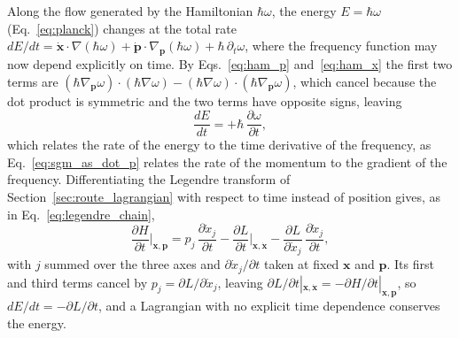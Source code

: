 \documentclass[aps,prd,onecolumn,tightenlines,nofootinbib,notitlepage,11pt,floatfix]{revtex4-2}
\theoremstyle{indentedtheorem}
\begin{document}
Along the flow generated by the Hamiltonian $\hbar\omega$, the energy $E=\hbar\omega$ (Eq.~\eqref{eq:planck}) changes at the total rate $dE/dt=\dot{\mathbf{x}}\cdot\nabla(\hbar\omega)+\dot{\mathbf{p}}\cdot\nabla_{\mathbf{p}}(\hbar\omega)+\hbar\,\partial_t\omega$, where the frequency function may now depend explicitly on time. By Eqs.~\eqref{eq:ham_p} and~\eqref{eq:ham_x} the first two terms are $(\hbar\nabla_{\mathbf{p}}\omega)\cdot(\hbar\nabla\omega)-(\hbar\nabla\omega)\cdot(\hbar\nabla_{\mathbf{p}}\omega)$, which cancel because the dot product is symmetric and the two terms have opposite signs, leaving
\begin{equation}
    \frac{dE}{dt} = +\hbar\,\frac{\partial\omega}{\partial t} ,
    \label{eq:sgm_temporal}
\end{equation}
which relates the rate of the energy to the time derivative of the frequency, as Eq.~\eqref{eq:sgm_as_dot_p} relates the rate of the momentum to the gradient of the frequency. Differentiating the Legendre transform of Section~\ref{sec:route_lagrangian} with respect to time instead of position gives, as in Eq.~\eqref{eq:legendre_chain},
\begin{equation}
    \frac{\partial H}{\partial t}\bigg|_{\mathbf{x},\mathbf{p}} = p_j\,\frac{\partial\dot{x}_j}{\partial t} - \frac{\partial L}{\partial t}\bigg|_{\mathbf{x},\dot{\mathbf{x}}} - \frac{\partial L}{\partial\dot{x}_j}\,\frac{\partial\dot{x}_j}{\partial t} ,
    \label{eq:legendre_time}
\end{equation}
with $j$ summed over the three axes and $\partial\dot{x}_j/\partial t$ taken at fixed $\mathbf{x}$ and $\mathbf{p}$. Its first and third terms cancel by $p_j=\partial L/\partial\dot{x}_j$, leaving $\partial L/\partial t|_{\mathbf{x},\dot{\mathbf{x}}}=-\partial H/\partial t|_{\mathbf{x},\mathbf{p}}$, so $dE/dt=-\partial L/\partial t$, and a Lagrangian with no explicit time dependence conserves the energy.
\end{document}
